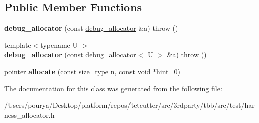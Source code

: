 \subsection*{Public Member Functions}
\begin{DoxyCompactItemize}
\item 
\hypertarget{classdebug__allocator_ae7e3fa0c28df6a74c613369b598fae39}{}{\bfseries debug\+\_\+allocator} (const \hyperlink{classdebug__allocator}{debug\+\_\+allocator} \&a)  throw ()\label{classdebug__allocator_ae7e3fa0c28df6a74c613369b598fae39}

\item 
\hypertarget{classdebug__allocator_ae873aadd83b2d565e22f3982d443efc2}{}{\footnotesize template$<$typename U $>$ }\\{\bfseries debug\+\_\+allocator} (const \hyperlink{classdebug__allocator}{debug\+\_\+allocator}$<$ U $>$ \&a)  throw ()\label{classdebug__allocator_ae873aadd83b2d565e22f3982d443efc2}

\item 
\hypertarget{classdebug__allocator_ac77492646761a57676fd4283dcd3b34e}{}pointer {\bfseries allocate} (const size\+\_\+type n, const void $\ast$hint=0)\label{classdebug__allocator_ac77492646761a57676fd4283dcd3b34e}

\end{DoxyCompactItemize}


The documentation for this class was generated from the following file\+:\begin{DoxyCompactItemize}
\item 
/\+Users/pourya/\+Desktop/platform/repos/tetcutter/src/3rdparty/tbb/src/test/harness\+\_\+allocator.\+h\end{DoxyCompactItemize}
